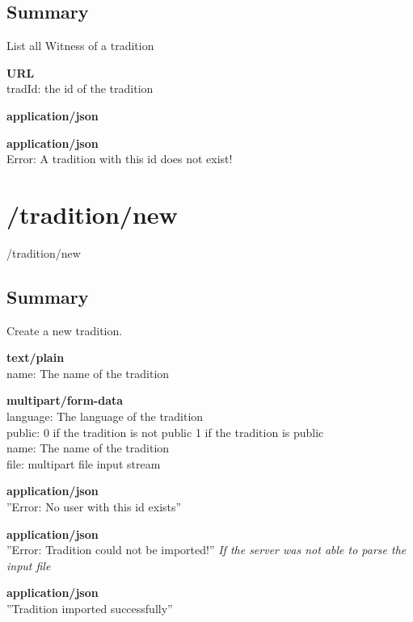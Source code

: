 \documentclass[11pt,fleqn,openany]{book} %
\begin{document}
\subsection*{Summary}
List all Witness of a tradition
\begin{parameter}\textbf{URL}\\
tradId: the id of the tradition \\
\end{parameter}
\begin{return}[OK]
\textbf{application/json}\\

\end{return}
\begin{return}
\textbf{application/json}\\
Error: A tradition with this id does not exist!
\end{return}

\section{/tradition/new}
\begin{post}
/tradition/new
\end{post}

\subsection*{Summary}
Create a new tradition.
\begin{parameter}
\textbf{text/plain}\\
name: The name of the tradition
\end{parameter}
\begin{parameter}
\textbf{multipart/form-data}\\
language: The language of the tradition\\
public: 0 if the tradition is not public 1 if the tradition is public\\
name: The name of the tradition\\
file: multipart file input stream
\end{parameter}
\begin{return}[CONFLICT]
\textbf{application/json}\\
''Error: No user with this id exists''
\end{return}
\begin{return}
\textbf{application/json}\\
''Error: Tradition could not be imported!''
\textit{If the server was not able to parse the input file}
\end{return}
\begin{return}[OK]
\textbf{application/json}\\
''Tradition imported successfully''
\end{return}
\end{document}
